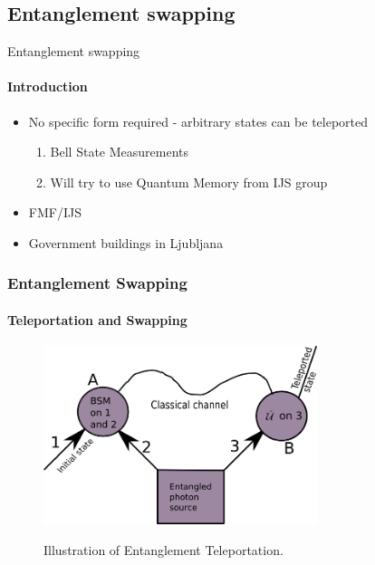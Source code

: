 \documentclass[serif,8pt]{beamer}
\begin{document}
{{\begin{frame}[t]
\end{frame}

\subsection{Entanglement swapping}
\begin{frame}{Entanglement swapping}
	\framesubtitle{Introduction}
	\begin{itemize}
		\item No specific form required - arbitrary states can be teleported
			\begin{enumerate}
				\item Bell State Measurements
				\item Will try to use Quantum Memory from IJS group
			\end{enumerate}
		\item FMF/IJS
		\item Government buildings in Ljubljana
	\end{itemize}
\end{frame}

\begin{frame}[t]
    \frametitle{Entanglement Swapping}
    \framesubtitle{Teleportation and Swapping}
    \begin{figure}[]
      \centering
      \caption{Illustration of Entanglement Teleportation.}
      \includegraphics[width=8cm]{EntanglementTeleportation.png}
	\label{fig:Tele}
    \end{figure}
\end{frame}

}}
\end{document}
